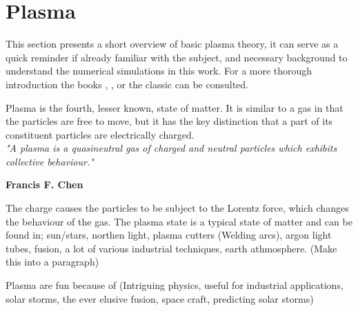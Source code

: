 \section{Plasma}
	\label{sec:plasma}
	This section presents a short overview of basic plasma theory, it can serve as a
	quick reminder if already familiar with the subject, and necessary
	background to understand the numerical simulations in this work.
	For a more thorough introduction the books \textit{}
    \citep{fitzpatrick_plasma_2014}, \textit{} \citep{goldston_introduction_1995},
    \textit{} \citep{pecseli_waves_2012} or the classic
    \textit{} \citep{chen_introduction_1984} can be consulted.

	Plasma is the fourth, lesser known, state of matter. It is similar to a gas
	in that the particles are free to move, but it has the key distinction that
	a part of its constituent particles are electrically charged.
	\\[1.0cm]
	\indent \textit{\large"A plasma is a quasineutral gas of charged and neutral particles which exhibits
	collective behaviour."}
	\begin{flushright}
	    \textbf{Francis F. Chen}\\[1.0cm]
	\end{flushright}
	The charge causes the particles to be subject to the Lorentz force, which
	changes the behaviour of the gas. The plasma state is a typical state of matter
	and can be found in;
	sun/stars, northen light, plasma cutters (Welding arcs), argon light tubes, fusion, a lot of various
	industrial techniques, earth athmosphere. (Make this into a paragraph)

	Plasma are fun because of (Intriguing physics, useful for industrial applications,
	solar storms, the ever elusive fusion, space craft, predicting solar storms)

